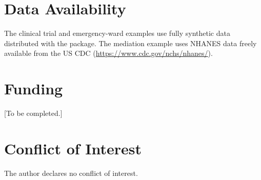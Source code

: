 \documentclass[12pt,a4paper]{article}
\begin{document}
\section*{Data Availability}
The clinical trial and emergency-ward examples use fully synthetic data distributed with the package. The mediation example uses NHANES data freely available from the US CDC (\url{https://www.cdc.gov/nchs/nhanes/}).

\section*{Funding}
[To be completed.]

\section*{Conflict of Interest}
The author declares no conflict of interest.



\end{document}
